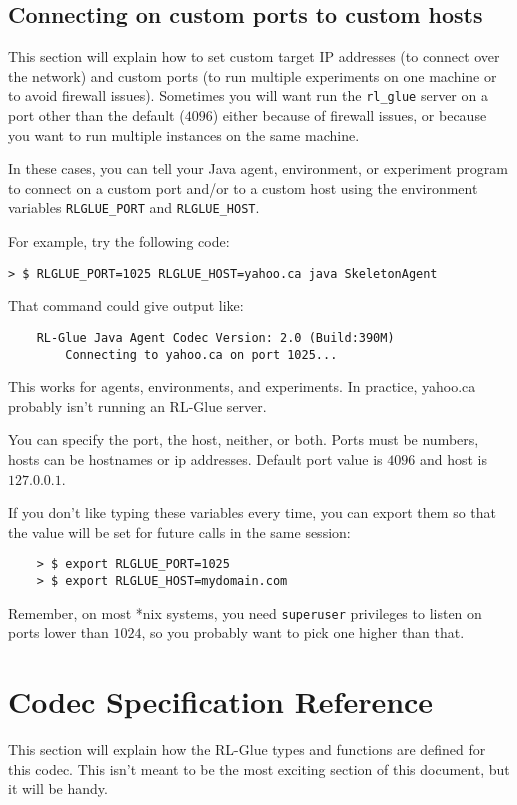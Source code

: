 \documentclass[11pt]{article}
\begin{document}
\subsection{Connecting on custom ports to custom hosts}
This section will explain how to set custom target IP addresses (to connect over the network) and custom ports (to run multiple experiments on one machine or to avoid firewall issues).
Sometimes you will want run the \texttt{rl\_glue} server on a port other than the default
($4096$) either because of firewall issues, or because you want to run multiple instances on the same machine.

In these cases, you can tell your Java agent, environment, or experiment program to connect on a custom port and/or to a custom host using the environment variables \texttt{RLGLUE\_PORT} and \texttt{RLGLUE\_HOST}.

For example, try the following code:
\begin{verbatim}
> $ RLGLUE_PORT=1025 RLGLUE_HOST=yahoo.ca java SkeletonAgent
\end{verbatim}

That command could give output like:
\begin{verbatim}
	RL-Glue Java Agent Codec Version: 2.0 (Build:390M)
		Connecting to yahoo.ca on port 1025...
\end{verbatim}

This works for agents, environments, and experiments.  In practice, yahoo.ca probably isn't running an RL-Glue server.

You can specify the port, the host, neither, or both.  Ports must be numbers, hosts can be hostnames or ip addresses. Default port value is $4096$ and host is $127.0.0.1$.

If you don't like typing these variables every time, you can export them so that the value will be set for future
calls  in the same session:
\begin{verbatim}
	> $ export RLGLUE_PORT=1025
	> $ export RLGLUE_HOST=mydomain.com
\end{verbatim}

Remember, on most *nix systems, you need \texttt{superuser} privileges to listen on ports lower than $1024$, so you probably want to pick one higher than that.

\section{Codec Specification Reference}
This section will explain how the RL-Glue types and functions are defined for this codec.  This isn't meant to be the most exciting section of this document, but it will
be handy.
\end{document}
